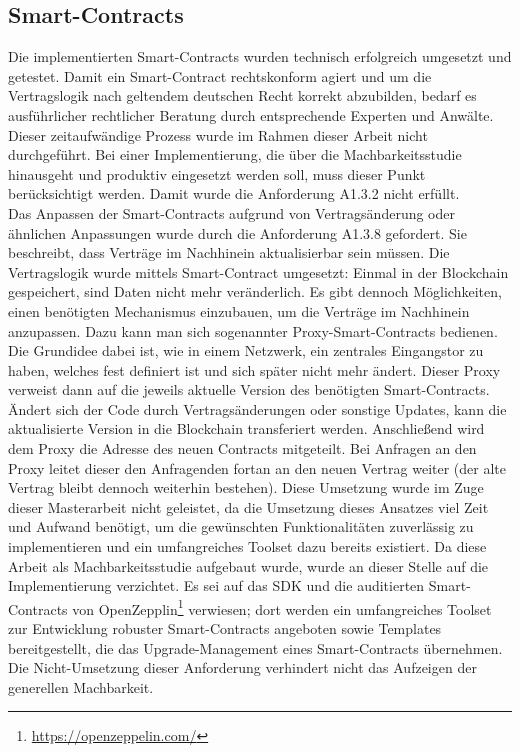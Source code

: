\subsection{Smart-Contracts}
\label{subsec:implementation:requirements:smart_contracts}
Die implementierten Smart-Contracts wurden technisch erfolgreich umgesetzt und getestet. Damit ein Smart-Contract rechtskonform agiert und um die Vertragslogik nach geltendem deutschen Recht korrekt abzubilden, bedarf es ausführlicher rechtlicher Beratung durch entsprechende Experten und Anwälte. Dieser zeitaufwändige Prozess wurde im Rahmen dieser Arbeit nicht durchgeführt. Bei einer Implementierung, die über die Machbarkeitsstudie hinausgeht und produktiv eingesetzt werden soll, muss dieser Punkt berücksichtigt werden. Damit wurde die Anforderung A1.3.2 nicht erfüllt.\\
Das Anpassen der Smart-Contracts aufgrund von Vertragsänderung oder ähnlichen Anpassungen wurde durch die Anforderung A1.3.8 gefordert. Sie beschreibt, dass Verträge im Nachhinein aktualisierbar sein müssen. Die Vertragslogik wurde mittels Smart-Contract umgesetzt: Einmal in der Blockchain gespeichert, sind Daten nicht mehr veränderlich. Es gibt dennoch Möglichkeiten, einen benötigten Mechanismus einzubauen, um die Verträge im Nachhinein anzupassen. Dazu kann man sich sogenannter Proxy-Smart-Contracts bedienen. Die Grundidee dabei ist, wie in einem Netzwerk, ein zentrales Eingangstor zu haben, welches fest definiert ist und sich später nicht mehr ändert. Dieser Proxy verweist dann auf die jeweils aktuelle Version des benötigten Smart-Contracts. Ändert sich der Code durch Vertragsänderungen oder sonstige Updates, kann die aktualisierte Version in die Blockchain transferiert werden. Anschließend wird dem Proxy die Adresse des neuen Contracts mitgeteilt. Bei Anfragen an den Proxy leitet dieser den Anfragenden fortan an den neuen Vertrag weiter (der alte Vertrag bleibt dennoch weiterhin bestehen). Diese Umsetzung wurde im Zuge dieser Masterarbeit nicht geleistet, da die Umsetzung dieses Ansatzes viel Zeit und Aufwand benötigt, um die gewünschten Funktionalitäten zuverlässig zu implementieren und ein umfangreiches Toolset dazu bereits existiert. Da diese Arbeit als Machbarkeitsstudie aufgebaut wurde, wurde an dieser Stelle auf die Implementierung verzichtet. Es sei auf das \ac{SDK} und die auditierten Smart-Contracts von OpenZepplin\footnote{\url{https://openzeppelin.com/}} verwiesen; dort werden ein umfangreiches Toolset zur Entwicklung robuster Smart-Contracts angeboten sowie Templates bereitgestellt, die das Upgrade-Management eines Smart-Contracts übernehmen. Die Nicht-Umsetzung dieser Anforderung verhindert nicht das Aufzeigen der generellen Machbarkeit.\\

